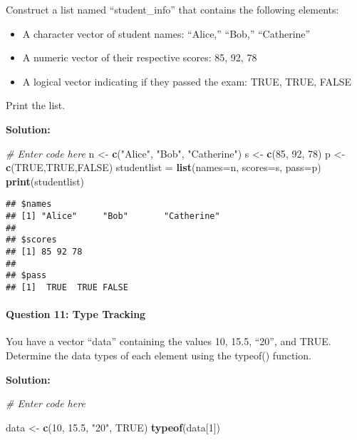 \documentclass[
]{article}
\newenvironment{Shaded}{\begin{snugshade}}{\end{snugshade}}
\newcommand{\AttributeTok}[1]{\textcolor[rgb]{0.13,0.29,0.53}{#1}}
\newcommand{\CommentTok}[1]{\textcolor[rgb]{0.56,0.35,0.01}{\textit{#1}}}
\newcommand{\ConstantTok}[1]{\textcolor[rgb]{0.56,0.35,0.01}{#1}}
\newcommand{\DecValTok}[1]{\textcolor[rgb]{0.00,0.00,0.81}{#1}}
\newcommand{\FloatTok}[1]{\textcolor[rgb]{0.00,0.00,0.81}{#1}}
\newcommand{\FunctionTok}[1]{\textcolor[rgb]{0.13,0.29,0.53}{\textbf{#1}}}
\newcommand{\NormalTok}[1]{#1}
\newcommand{\OtherTok}[1]{\textcolor[rgb]{0.56,0.35,0.01}{#1}}
\newcommand{\StringTok}[1]{\textcolor[rgb]{0.31,0.60,0.02}{#1}}
\begin{document}
Construct a list named ``student\_info'' that contains the following
elements:

\begin{itemize}
\item
  A character vector of student names: ``Alice,'' ``Bob,'' ``Catherine''
\item
  A numeric vector of their respective scores: 85, 92, 78
\item
  A logical vector indicating if they passed the exam: TRUE, TRUE, FALSE
\end{itemize}

Print the list.

\textbf{Solution:}

\begin{Shaded}
\begin{Highlighting}[]
\CommentTok{\# Enter code here}
\NormalTok{n }\OtherTok{\textless{}{-}} \FunctionTok{c}\NormalTok{(}\StringTok{"Alice"}\NormalTok{, }\StringTok{"Bob"}\NormalTok{, }\StringTok{"Catherine"}\NormalTok{)}
\NormalTok{s }\OtherTok{\textless{}{-}} \FunctionTok{c}\NormalTok{(}\DecValTok{85}\NormalTok{, }\DecValTok{92}\NormalTok{, }\DecValTok{78}\NormalTok{)}
\NormalTok{p }\OtherTok{\textless{}{-}} \FunctionTok{c}\NormalTok{(}\ConstantTok{TRUE}\NormalTok{,}\ConstantTok{TRUE}\NormalTok{,}\ConstantTok{FALSE}\NormalTok{)}
\NormalTok{studentlist }\OtherTok{=} \FunctionTok{list}\NormalTok{(}\AttributeTok{names=}\NormalTok{n, }\AttributeTok{scores=}\NormalTok{s, }\AttributeTok{pass=}\NormalTok{p)}
\FunctionTok{print}\NormalTok{(studentlist)}
\end{Highlighting}
\end{Shaded}

\begin{verbatim}
## $names
## [1] "Alice"     "Bob"       "Catherine"
## 
## $scores
## [1] 85 92 78
## 
## $pass
## [1]  TRUE  TRUE FALSE
\end{verbatim}

\hypertarget{question-11-type-tracking}{%
\paragraph{Question 11: Type Tracking}\label{question-11-type-tracking}}

You have a vector ``data'' containing the values 10, 15.5, ``20'', and
TRUE. Determine the data types of each element using the typeof()
function.

\textbf{Solution:}

\begin{Shaded}
\begin{Highlighting}[]
\CommentTok{\# Enter code here}

\NormalTok{data }\OtherTok{\textless{}{-}} \FunctionTok{c}\NormalTok{(}\DecValTok{10}\NormalTok{, }\FloatTok{15.5}\NormalTok{, }\StringTok{"20"}\NormalTok{, }\ConstantTok{TRUE}\NormalTok{)}
\FunctionTok{typeof}\NormalTok{(data[}\DecValTok{1}\NormalTok{])}
\end{Highlighting}
\end{Shaded}
\end{document}
